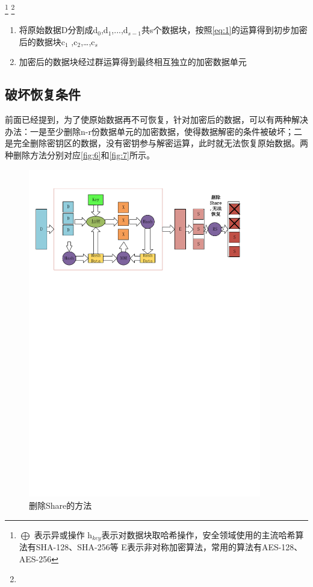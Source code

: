 \footnote{$\bigoplus$ 表示异或操作
\newline h$_{key}$表示对数据块取哈希操作，安全领域使用的主流哈希算法有SHA-128、SHA-256等
\newline E表示非对称加密算法，常用的算法有AES-128、AES-256
}
\footnote{}
\begin{enumerate}
    \item 将原始数据D分割成d$_{0}$,d$_{1}$,...,d$_{s-1}$共s个数据块，按照\autoref{eq:1}的运算得到初步加密后的数据块c$_{1}$ ,c$_{2}$,…,c$_{s}$
	\item 加密后的数据块经过群运算得到最终相互独立的加密数据单元
\end{enumerate}

\subsection{破坏恢复条件}
前面已经提到，为了使原始数据再不可恢复，针对加密后的数据，可以有两种解决办法：一是至少删除n-r份数据单元的加密数据，使得数据解密的条件被破坏；二是完全删除密钥区的数据，没有密钥参与解密运算，此时就无法恢复原始数据。两种删除方法分别对应\autoref{fig:6}和\autoref{fig:7}所示。
\begin{figure}[H]
	\centering
	\includegraphics[width=4in]{Pics/del-share.pdf}
	\caption{删除Share的方法}\label{fig:6}
\end{figure}
